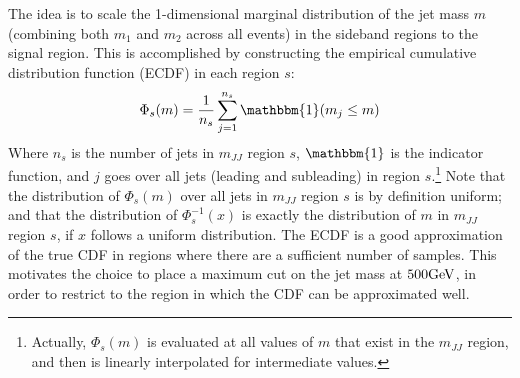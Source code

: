 The idea is to scale the 1-dimensional marginal distribution of the jet mass $m$ (combining both $m_1$ and $m_2$ across all events) in the sideband regions to the signal region.
This is accomplished by constructing the empirical cumulative distribution function (ECDF) in each region $s$:
\begin{align}
  \Phi_s(m) = \frac{1}{n_s} \sum_{j=1}^{n_s} \mathbbm{1}(m_j\le m)
\end{align}
Where $n_s$ is the number of jets in $m_{JJ}$ region $s$, $\mathbbm{1}$ is the indicator function, and $j$ goes over all jets (leading and subleading) in region $s$.\footnote{Actually, $\Phi_s(m)$ is evaluated at all values of $m$ that exist in the $m_{JJ}$ region, and then is linearly interpolated for intermediate values.}
Note that the distribution of $\Phi_s(m)$ over all jets in $m_{JJ}$ region $s$ is by definition uniform; and that the distribution of $\Phi^{-1}_s(x)$ is exactly the distribution of $m$ in $m_{JJ}$ region $s$, if $x$ follows a uniform distribution.
The ECDF is a good approximation of the true CDF in regions where there are a sufficient number of samples.
This motivates the choice to place a maximum cut on the jet mass at $500 \mathrm{GeV}$, in order to restrict to the region in which the CDF can be approximated well.

